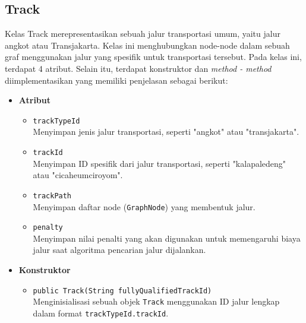 \subsection{Track}
Kelas Track merepresentasikan sebuah jalur transportasi umum, yaitu jalur angkot atau Transjakarta. Kelas ini menghubungkan node-node dalam sebuah graf menggunakan jalur yang spesifik untuk transportasi tersebut. Pada kelas ini, terdapat 4 atribut. Selain itu, terdapat konstruktor dan \textit{method - method} diimplementasikan yang memiliki penjelasan sebagai berikut:
\begin{itemize}
    \item \textbf{Atribut}
    \begin{itemize}
        \item \texttt{trackTypeId}
        \\ Menyimpan jenis jalur transportasi, seperti "angkot" atau "transjakarta".
        \item \texttt{trackId}
        \\ Menyimpan ID spesifik dari jalur transportasi, seperti "kalapaledeng" atau "cicaheumciroyom".
        \item \texttt{trackPath}
        \\ Menyimpan daftar node (\texttt{GraphNode}) yang membentuk jalur.
        \item \texttt{penalty}
        \\ Menyimpan nilai penalti yang akan digunakan untuk memengaruhi biaya jalur saat algoritma pencarian jalur dijalankan.
    \end{itemize}

    \item \textbf{Konstruktor}
    \begin{itemize}
        \item \texttt{public Track(String fullyQualifiedTrackId)}
        \\ Menginisialisasi sebuah objek \texttt{Track} menggunakan ID jalur lengkap dalam format \texttt{trackTypeId.trackId}.
    \end{itemize}


\end{itemize}
